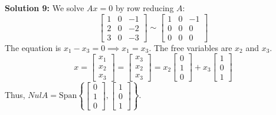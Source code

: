 \documentclass[11pt]{article}
\begin{document}
\vspace{0.3cm}
\textbf{Solution 9:} We solve $Ax = 0$ by row reducing $A$:
$$ \begin{bmatrix} 1 & 0 & -1 \\ 2 & 0 & -2 \\ 3 & 0 & -3 \end{bmatrix} \sim \begin{bmatrix} 1 & 0 & -1 \\ 0 & 0 & 0 \\ 0 & 0 & 0 \end{bmatrix} $$
The equation is $x_1 - x_3 = 0 \implies x_1 = x_3$. The free variables are $x_2$ and $x_3$.
$$ x = \begin{bmatrix} x_1 \\ x_2 \\ x_3 \end{bmatrix} = \begin{bmatrix} x_3 \\ x_2 \\ x_3 \end{bmatrix} = x_2 \begin{bmatrix} 0 \\ 1 \\ 0 \end{bmatrix} + x_3 \begin{bmatrix} 1 \\ 0 \\ 1 \end{bmatrix} $$
Thus, $Nul A = \text{Span} \left\{ \begin{bmatrix} 0 \\ 1 \\ 0 \end{bmatrix}, \begin{bmatrix} 1 \\ 0 \\ 1 \end{bmatrix} \right\}$.
\end{document}
